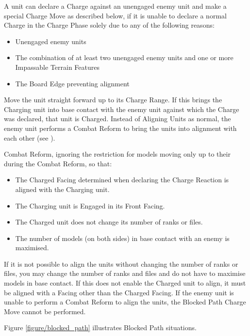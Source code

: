 A unit can declare a Charge against an unengaged enemy unit and make a special Charge Move as described below, if it is unable to declare a normal Charge in the Charge Phase solely due to any of the following reasons:
\begin{itemize}
	\item Unengaged enemy units
	\item The combination of at least two unengaged enemy units and one or more Impassable Terrain Features
	\item The Board Edge preventing alignment
\end{itemize}

Move the unit straight forward up to its Charge Range. If this brings the Charging unit into base contact with the enemy unit against which the Charge was declared, that unit is Charged. Instead of Aligning Units as normal, the enemy unit performs a Combat Reform to bring the units into alignment with each other (see ).

\columnbreak

Combat Reform, ignoring the restriction for models moving only up to their \MarchRate{} during the Combat Reform, so that:

\begin{itemize}
	\item The Charged Facing determined when declaring the Charge Reaction is aligned with the Charging unit.
	\item The Charging unit is Engaged in its Front Facing.
	\item The Charged unit does not change its number of ranks or files.
	\item The number of models (on both sides) in base contact with an enemy is maximised.
\end{itemize}

If it is not possible to align the units without changing the number of ranks or files, you may change the number of ranks and files and do not have to maximise models in base contact. If this does not enable the Charged unit to align, it must be aligned with a Facing other than the Charged Facing. If the enemy unit is unable to perform a Combat Reform to align the units, the Blocked Path Charge Move cannot be performed.

Figure \ref{figure/blocked_path} illustrates Blocked Path situations.

